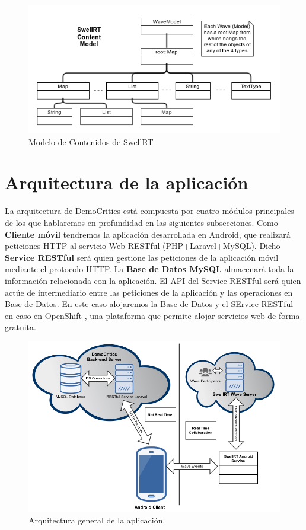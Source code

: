 	
	\begin{figure}[H]
	  \centering
	    \includegraphics[keepaspectratio, scale=0.6]{Media/Captures/waveDataModel.png}
	  \caption{Modelo de Contenidos de SwellRT}
	  \label{fig:wave_swellRT}
	\end{figure}

\section{Arquitectura de la aplicación}

La arquitectura de DemoCritics está compuesta por cuatro módulos principales de los que hablaremos en profundidad en las siguientes subsecciones. Como \textbf{Cliente móvil} tendremos la aplicación desarrollada en Android, que realizará peticiones HTTP al servicio Web RESTful (PHP+Laravel+MySQL). Dicho \textbf{Service RESTful} será quien gestione las peticiones de la aplicación móvil mediante el protocolo HTTP. La \textbf{Base de Datos MySQL} almacenará toda la información relacionada con la aplicación. El API del Service RESTful será quien actúe de intermediario entre las peticiones de la aplicación y las operaciones en Base de Datos. En este caso alojaremos la Base de Datos y el SErvice RESTful en caso en OpenShift \cite{ref:OpenShift}, una plataforma que permite alojar servicios web de forma gratuita.

\begin{figure}[H]
\centering
\includegraphics[keepaspectratio, scale=0.55]{Media/Diagrams/generalArchitectureDiagram.png}
\caption{Arquitectura general de la aplicación.}
\label{fig:architecture}
\end{figure}

